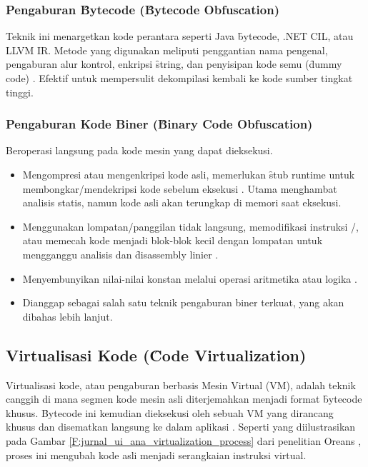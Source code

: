 \subsubsection{Pengaburan \f{Bytecode} (\f{Bytecode Obfuscation})}
Teknik ini menargetkan kode perantara seperti Java \f{bytecode}, .NET CIL, atau LLVM IR. Metode yang digunakan meliputi penggantian nama pengenal, pengaburan alur kontrol, enkripsi \f{string}, dan penyisipan kode semu (\f{dummy code}) \cite{Pie18, Yak20}. Efektif untuk mempersulit dekompilasi kembali ke kode sumber tingkat tinggi.

\subsubsection{Pengaburan Kode Biner (\f{Binary Code Obfuscation})}
Beroperasi langsung pada kode mesin yang dapat dieksekusi.
\begin{itemize}
    \item {} Mengompresi atau mengenkripsi kode asli, memerlukan \f{stub} runtime untuk membongkar/mendekripsi kode sebelum eksekusi \cite{Rou13}. Utama menghambat analisis statis, namun kode asli akan terungkap di memori saat eksekusi.
    \item {} Menggunakan lompatan/panggilan tidak langsung, memodifikasi instruksi /, atau memecah kode menjadi blok-blok kecil dengan lompatan untuk mengganggu analisis dan \f{disassembly} linier \cite{Rou13}.
    \item {} Menyembunyikan nilai-nilai konstan melalui operasi aritmetika atau logika \cite{Rou13}.
    \item {} Dianggap sebagai salah satu teknik pengaburan biner terkuat, yang akan dibahas lebih lanjut.
\end{itemize}

\subsection{Virtualisasi Kode (\f{Code Virtualization})}
Virtualisasi kode, atau pengaburan berbasis Mesin Virtual (VM), adalah teknik canggih di mana segmen kode mesin asli diterjemahkan menjadi format \f{bytecode} khusus. \f{Bytecode} ini kemudian dieksekusi oleh sebuah VM yang dirancang khusus dan disematkan langsung ke dalam aplikasi \cite{Ore06, Zho24}. Seperti yang diilustrasikan pada Gambar \ref{F:jurnal_ui_ana_virtualization_process} dari penelitian Oreans \cite{Ore06}, proses ini mengubah kode asli menjadi serangkaian instruksi virtual.

